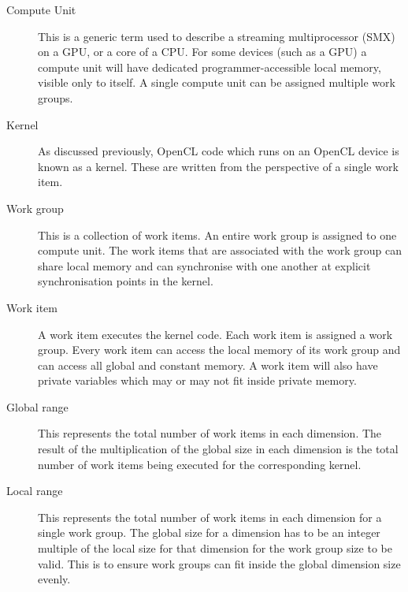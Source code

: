 \begin{description}

\item[Compute Unit] This is a generic term used to describe a streaming
multiprocessor (SMX) on a GPU, or a core of a CPU. For some devices (such as a
GPU) a compute unit will have dedicated programmer-accessible local memory,
visible only to itself. A single compute unit can be assigned multiple work
groups.

\item[Kernel] As discussed previously, OpenCL code which runs on an OpenCL
device is known as a kernel. These are written from the perspective of a single
work item.

\item[Work group] This is a collection of work items. An entire work group is
assigned to one compute unit. The work items that are associated with the work
group can share local memory and can synchronise with one another at explicit
synchronisation points in the kernel.

\item[Work item] A work item executes the kernel code. Each work item is
assigned a work group. Every work item can access the local memory of its work
group and can access all global and constant memory. A work item will also
have private variables which may or may not fit inside private memory.

\item[Global range] This represents the total number of work items in each
dimension. The result of the multiplication of the global size in each dimension
is the total number of work items being executed for the corresponding kernel.

\item[Local range] This represents the total number of work items in each
dimension for a single work group. The global size for a dimension has to be an
integer multiple of the local size for that dimension for the work group size
to be valid. This is to ensure work groups can fit inside the global dimension
size evenly.

\end{description}

